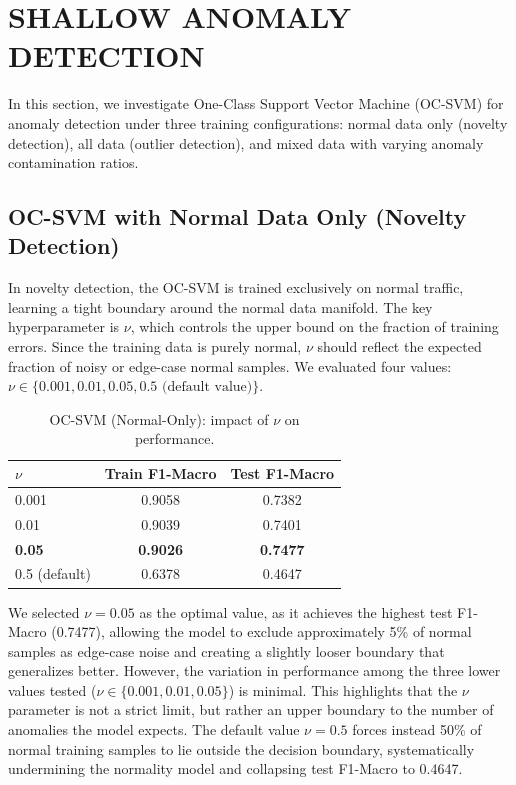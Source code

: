 
\section{SHALLOW ANOMALY DETECTION} \label{sec:task2}

In this section, we investigate One-Class Support Vector Machine (OC-SVM) for anomaly detection under three training configurations: normal data only (novelty detection), all data (outlier detection), and mixed data with varying anomaly contamination ratios.

\subsection{OC-SVM with Normal Data Only (Novelty Detection)} \label{sec:ocsvm_normal}

    In novelty detection, the OC-SVM is trained exclusively on normal traffic, learning a tight boundary around the normal data manifold.
    The key hyperparameter is $\nu$, which controls the upper bound on the fraction of training errors.
    Since the training data is purely normal, $\nu$ should reflect the expected fraction of noisy or edge-case normal samples.
    We evaluated four values: $\nu \in \{0.001, 0.01, 0.05, 0.5 \text{ (default value)}\}$.

    \begin{table}[H]
        \centering
        \begin{tabular}{@{}lcc@{}}
            \toprule
            \textbf{$\nu$} & \textbf{Train F1-Macro} & \textbf{Test F1-Macro} \\
            \midrule
            0.001             & 0.9058 & 0.7382 \\
            0.01              & 0.9039 & 0.7401 \\
            \textbf{0.05}     & \textbf{0.9026} & \textbf{0.7477} \\
            0.5 (default)     & 0.6378 & 0.4647 \\
            \bottomrule
        \end{tabular}
        \caption{OC-SVM (Normal-Only): impact of $\nu$ on performance.}
        \label{tab:nu_comparison}
    \end{table}

    \noindent
    We selected $\nu = 0.05$ as the optimal value, as it achieves the highest test F1-Macro (0.7477), allowing the model to exclude approximately 5\% of normal samples as edge-case noise and creating a slightly looser boundary that generalizes better.
    However, the variation in performance among the three lower values tested ($\nu \in \{0.001, 0.01, 0.05\}$) is minimal. 
    This highlights that the $\nu$ parameter is not a strict limit, but rather an upper boundary to the number of anomalies the model expects. 
    The default value $\nu = 0.5$ forces instead 50\% of normal training samples to lie outside the decision boundary, systematically undermining the normality model and collapsing test F1-Macro to 0.4647.

